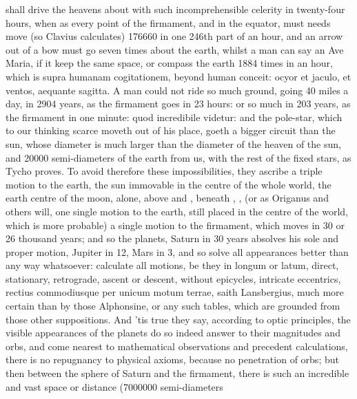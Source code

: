 {shall drive the heavens about with such incomprehensible celerity in
twenty-four hours, when as every point of the firmament, and in the
equator, must needs move (so Clavius calculates) 176\thinspace{}660 in one
246th part of an hour, and an arrow out of a bow must go seven times
about the earth, whilst a man can say an Ave Maria, if it keep the same
space, or compass the earth 1884 times in an hour, which is supra
humanam cogitationem, beyond human conceit: ocyor et jaculo, et ventos,
aequante sagitta. A man could not ride so much ground, going 40 miles a
day, in 2904 years, as the firmament goes in 23 hours: or so much in
203 years, as the firmament in one minute: quod incredibile videtur:
and the pole-star, which to our thinking scarce moveth out of his
place, goeth a bigger circuit than the sun, whose diameter is much
larger than the diameter of the heaven of the sun, and 20\thinspace{}000
semi-diameters of the earth from us, with the rest of the fixed stars,
as Tycho proves. To avoid therefore these impossibilities, they ascribe
a triple motion to the earth, the sun immovable in the centre of the
whole world, the earth centre of the moon, alone, above  and ,
beneath , ,  (or as Origanus and others will, one single
motion to the earth, still placed in the centre of the world, which is
more probable) a single motion to the firmament, which moves in 30 or
26 thousand years; and so the planets, Saturn in 30 years absolves his
sole and proper motion, Jupiter in 12, Mars in 3, \etc{} and so solve all
appearances better than any way whatsoever: calculate all motions, be
they in longum or latum, direct, stationary, retrograde, ascent or
descent, without epicycles, intricate eccentrics, \etc{} rectius
commodiusque per unicum motum terrae, saith Lansbergius, much more
certain than by those Alphonsine, or any such tables, which are
grounded from those other suppositions. And 'tis true they say,
according to optic principles, the visible appearances of the planets
do so indeed answer to their magnitudes and orbs, and come nearest to
mathematical observations and precedent calculations, there is no
repugnancy to physical axioms, because no penetration of orbs; but then
between the sphere of Saturn and the firmament, there is such an
incredible and vast space or distance (7\thinspace{}000\thinspace{}000 semi-diameters
}
